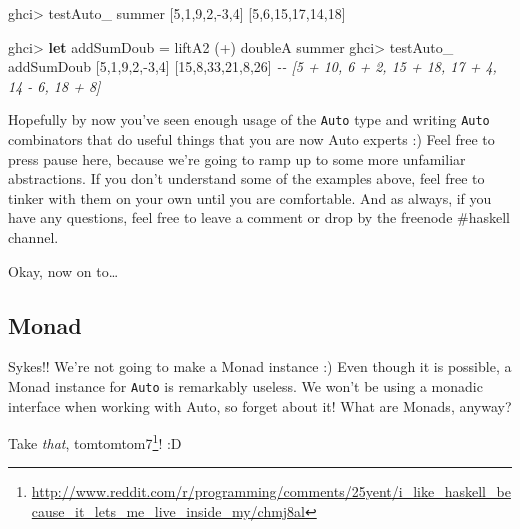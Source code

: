 \documentclass[]{article}
\newenvironment{Shaded}{}{}
\newcommand{\CommentTok}[1]{\textcolor[rgb]{0.38,0.63,0.69}{\textit{#1}}}
\newcommand{\DecValTok}[1]{\textcolor[rgb]{0.25,0.63,0.44}{#1}}
\newcommand{\KeywordTok}[1]{\textcolor[rgb]{0.00,0.44,0.13}{\textbf{#1}}}
\newcommand{\NormalTok}[1]{#1}
\newcommand{\OperatorTok}[1]{\textcolor[rgb]{0.40,0.40,0.40}{#1}}
\newcommand{\OtherTok}[1]{\textcolor[rgb]{0.00,0.44,0.13}{#1}}
\renewcommand{\href}[2]{#2\footnote{\url{#1}}}
\begin{document}
\begin{Shaded}
\begin{Highlighting}[]
\NormalTok{ghci}\OperatorTok{>}\NormalTok{ testAuto\_ summer [}\DecValTok{5}\NormalTok{,}\DecValTok{1}\NormalTok{,}\DecValTok{9}\NormalTok{,}\DecValTok{2}\NormalTok{,}\OperatorTok{{-}}\DecValTok{3}\NormalTok{,}\DecValTok{4}\NormalTok{]}
\NormalTok{[}\DecValTok{5}\NormalTok{,}\DecValTok{6}\NormalTok{,}\DecValTok{15}\NormalTok{,}\DecValTok{17}\NormalTok{,}\DecValTok{14}\NormalTok{,}\DecValTok{18}\NormalTok{]}

\NormalTok{ghci}\OperatorTok{>} \KeywordTok{let}\NormalTok{ addSumDoub }\OtherTok{=}\NormalTok{ liftA2 (}\OperatorTok{+}\NormalTok{) doubleA summer}
\NormalTok{ghci}\OperatorTok{>}\NormalTok{ testAuto\_ addSumDoub [}\DecValTok{5}\NormalTok{,}\DecValTok{1}\NormalTok{,}\DecValTok{9}\NormalTok{,}\DecValTok{2}\NormalTok{,}\OperatorTok{{-}}\DecValTok{3}\NormalTok{,}\DecValTok{4}\NormalTok{]}
\NormalTok{[}\DecValTok{15}\NormalTok{,}\DecValTok{8}\NormalTok{,}\DecValTok{33}\NormalTok{,}\DecValTok{21}\NormalTok{,}\DecValTok{8}\NormalTok{,}\DecValTok{26}\NormalTok{]}
\CommentTok{{-}{-} [5 + 10, 6 + 2, 15 + 18, 17 + 4, 14 {-} 6, 18 + 8]}
\end{Highlighting}
\end{Shaded}

Hopefully by now you've seen enough usage of the \texttt{Auto} type and writing
\texttt{Auto} combinators that do useful things that you are now Auto experts :)
Feel free to press pause here, because we're going to ramp up to some more
unfamiliar abstractions. If you don't understand some of the examples above,
feel free to tinker with them on your own until you are comfortable. And as
always, if you have any questions, feel free to leave a comment or drop by the
freenode \#haskell channel.

Okay, now on to\ldots{}

\hypertarget{monad}{%
\subsection{Monad}\label{monad}}

Sykes!! We're not going to make a Monad instance :) Even though it is possible,
a Monad instance for \texttt{Auto} is remarkably useless. We won't be using a
monadic interface when working with Auto, so forget about it! What are Monads,
anyway?

Take \emph{that},
\href{http://www.reddit.com/r/programming/comments/25yent/i_like_haskell_because_it_lets_me_live_inside_my/chmj8al}{tomtomtom7}!
:D
\end{document}
